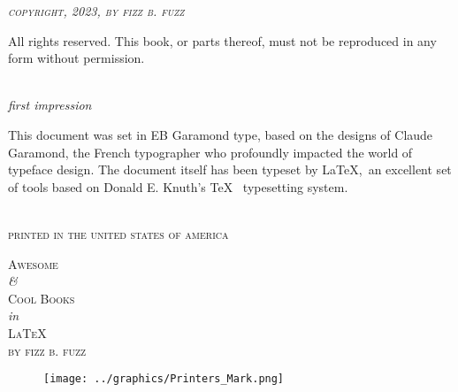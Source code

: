 \documentclass[crownvopaper,
               extrafontsizes,
               11pt,
               twoside,
               openright,
               final]{memoir}
\begin{document}
\thispagestyle{empty}
\begin{center}
 {\scshape\itshape copyright, 2023, by fizz b. fuzz}\\
 \vspace{3ex}
 \parbox{0.8\textwidth}{\small
  All rights reserved. This book, or parts thereof, must
  not be reproduced in any form without permission.
 }\\
 \vspace{5ex}
 {\small\itshape first impression}\\
 \vspace{5ex}
 \parbox{0.8\textwidth}{\footnotesize {}
  This document was set in EB Garamond type, based on the
  designs of Claude Garamond, the French typographer who profoundly
  impacted the world of typeface design. The document itself
  has been typeset by \LaTeX ,~an excellent set of tools
  based on Donald E. Knuth's \TeX~ typesetting system.
 }\\
 \vfill
 {\small\scshape printed in the united states of america}
\end{center}
\newpage

\begin{titlingpage}
 \begin{center}
  \vspace{10ex}
  {\scshape\Large Awesome}\\
  \vspace{2ex}
  \textit{\Large \&}\\
  \vspace{2ex}
  {\scshape\Large Cool Books}\\
  \vspace{2ex}
  \textit{\Large in}\\
  \vspace{2ex}
  {\scshape\Large \LaTeX}\\
  \vspace{10ex}
  {\scshape by fizz b. fuzz}\\
  \vfill
 \end{center}
 \begin{figure}[h!]
   \centering
   \texttt{[image: ../graphics/Printers\_Mark.png]}
  \end{figure}
 \end{titlingpage}
\end{document}
